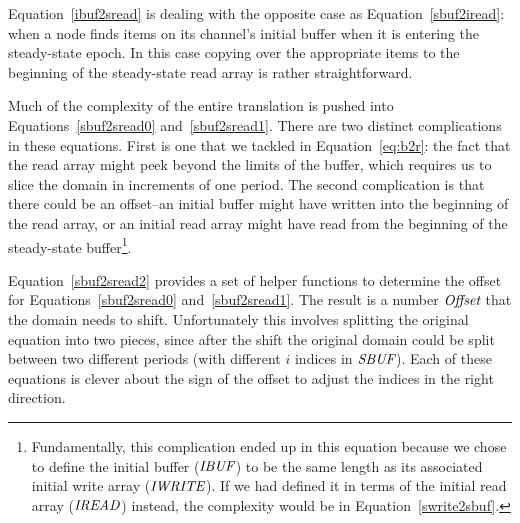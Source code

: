 Equation~\ref{ibuf2sread} is dealing with the opposite case as
Equation~\ref{sbuf2iread}: when a node finds items on its channel's
initial buffer when it is entering the steady-state epoch.  In this
case copying over the appropriate items to the beginning of the
steady-state read array is rather straightforward.

Much of the complexity of the entire translation is pushed into
Equations~\ref{sbuf2sread0} and~\ref{sbuf2sread1}.  There are two
distinct complications in these equations.  First is one that we
tackled in Equation~\ref{eq:b2r}: the fact that the read array might
peek beyond the limits of the buffer, which requires us to slice the
domain in increments of one period.  The second complication is that
there could be an offset--an initial buffer might have written into
the beginning of the read array, or an initial read array might have
read from the beginning of the steady-state
buffer\footnote{Fundamentally, this complication ended up in this
equation because we chose to define the initial buffer ($\mbox{\it IBUF}$)
to be the same length as its associated initial write array
($\mbox{\it IWRITE}$).  If we had defined it in terms of the initial read
array ($\mbox{\it IREAD}$) instead, the complexity would be in
Equation~\ref{swrite2sbuf}.}.

Equation~\ref{sbuf2sread2} provides a set of helper functions to
determine the offset for Equations~\ref{sbuf2sread0}
and~\ref{sbuf2sread1}.  The result is a number $\mbox{\it Offset}$ that the
domain needs to shift.  Unfortunately this involves splitting the
original equation into two pieces, since after the shift the original
domain could be split between two different periods (with different
$i$ indices in $\mbox{\it SBUF}$).  Each of these equations is clever about
the sign of the offset to adjust the indices in the right direction.
